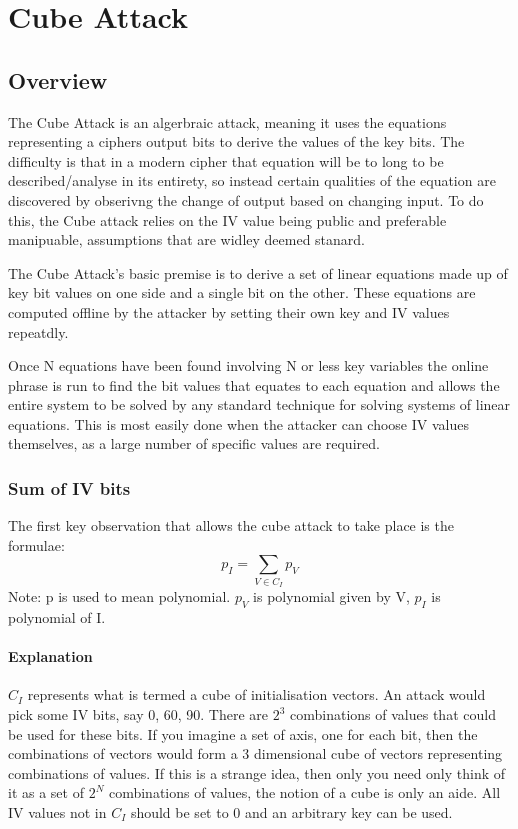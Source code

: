 \documentclass{report}
\begin{document}

\chapter{Cube Attack}
\section{Overview}
The Cube Attack is an algerbraic attack, meaning it uses the equations representing a ciphers output bits to derive the values of the key bits. The difficulty is that in a modern cipher that equation will be to long to be described/analyse in its entirety, so instead certain qualities of the equation are discovered by obserivng the change of output based on changing input. To do this, the Cube attack relies on the IV value being public and preferable manipuable, assumptions that are widley deemed stanard. %

The Cube Attack's basic premise is to derive a set of linear equations made up of key bit values on one side and a single bit on the other. These equations are computed offline by the attacker by setting their own key and IV values repeatdly.

Once N equations have been found involving N or less key variables the online phrase is run to find the bit values that equates to each equation and allows the entire system to be solved by any standard technique for solving systems of linear equations. %
This is most easily done when the attacker can choose IV values themselves, as a large number of specific values are required.
\subsection{Sum of IV bits}
The first key observation that allows the cube attack to take place is the formulae:
\begin{equation} \label{eq:poly_sum}
p_I = \sum\limits_{V \in C_I} p_V 
\end{equation}
Note: p is used to mean polynomial. $p_V$ is polynomial given by V, $p_I$ is polynomial of I.
\subsubsection{Explanation}
$C_I$ represents what is termed a cube of initialisation vectors. An attack would pick some IV bits, say 0, 60, 90. There are $2^3$ combinations of values that could be used for these bits. If you imagine a set of axis, one for each bit, then the combinations of vectors would form a 3 dimensional cube of vectors representing combinations of values. If this is a strange idea, then only you need only think of it as a set of $2^N$ combinations of values, the notion of a cube is only an aide. All IV values not in $C_I$ should be set to 0 and an arbitrary key can be used.
\end{document}
